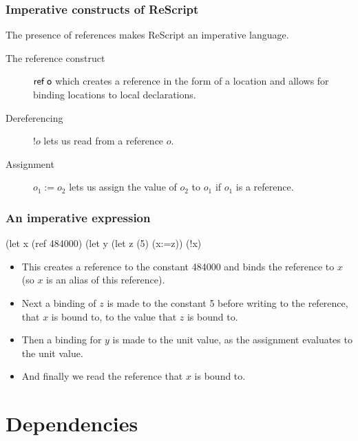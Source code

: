 \documentclass[aspectratio=169]{beamer}
\begin{document}
\begin{frame}
  \frametitle{Imperative constructs of ReScript}
  
  The presence of references makes ReScript an imperative language.

  \begin{description}
    \item[The reference construct] $\textsf{ref\;o}$ which creates a reference in the form of a location and allows for binding locations to local declarations.

    \item[Dereferencing] $!o$ lets us read from a reference $o$.

    \item[Assignment] $o_1 := o_2$ lets us assign the value of $o_2$
      to $o_1$ if $o_1$ is a reference.
\end{description}


\end{frame}



\begin{frame}[fragile]
  \frametitle{An imperative expression}
  
\begin{rescript}
       (let x (ref 484000)
           (let y (let z (5)
               (x:=z)) (!x)
\end{rescript}
%
\begin{itemize}
\item<1->This creates a reference to the constant 484000 and binds the reference to
  $x$ (so $x$ is an alias of this reference).
\item<2-> Next a binding of $z$ is made
to the constant 5 before writing to the reference, that $x$ is bound to, 
to the value that $z$ is bound to.
\item<3-> Then a binding for $y$ is made to the unit value,
  as the assignment evaluates to the unit value.
\item<4-> And finally we read the reference that $x$ is bound to.
\end{itemize}

\end{frame}

\section{Dependencies}
\end{document}
